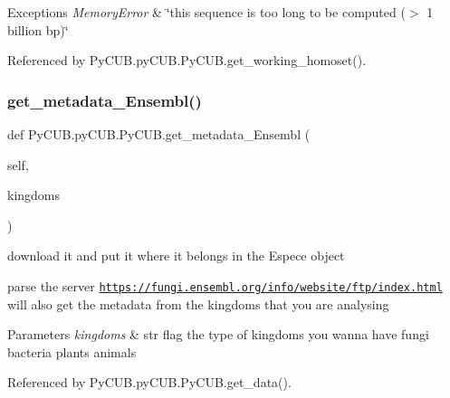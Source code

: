 \begin{DoxyExceptions}{Exceptions}
{\em Memory\+Error} & \char`\"{}this sequence is too long to be computed ($>$ 1 billion bp)\char`\"{} \\
\hline
\end{DoxyExceptions}


Referenced by Py\+C\+U\+B.\+py\+C\+U\+B.\+Py\+C\+U\+B.\+get\+\_\+working\+\_\+homoset().

\mbox{\label{class_py_c_u_b_1_1py_c_u_b_1_1_py_c_u_b_ae561ba39b9c3919a83b51944f155e4a4}} 
\subsubsection{\texorpdfstring{get\+\_\+metadata\+\_\+\+Ensembl()}{get\_metadata\_Ensembl()}}
{\footnotesize\ttfamily def Py\+C\+U\+B.\+py\+C\+U\+B.\+Py\+C\+U\+B.\+get\+\_\+metadata\+\_\+\+Ensembl (\begin{DoxyParamCaption}\item[{}]{self,  }\item[{}]{kingdoms }\end{DoxyParamCaption})}



download it and put it where it belongs in the Espece object 

parse the server \href{https://fungi.ensembl.org/info/website/ftp/index.html}{\tt https\+://fungi.\+ensembl.\+org/info/website/ftp/index.\+html} will also get the metadata from the kingdoms that you are analysing


\begin{DoxyParams}{Parameters}
{\em kingdoms} & str flag the type of kingdoms you wanna have \textquotesingle{}fungi\textquotesingle{} \textquotesingle{}bacteria\textquotesingle{} \textquotesingle{}plants\textquotesingle{} \textquotesingle{}animals\textquotesingle{} \\
\hline
\end{DoxyParams}


Referenced by Py\+C\+U\+B.\+py\+C\+U\+B.\+Py\+C\+U\+B.\+get\+\_\+data().

\mbox{\label{class_py_c_u_b_1_1py_c_u_b_1_1_py_c_u_b_a1ff011ae5b64518d60bedcf1b98314ef}} 
